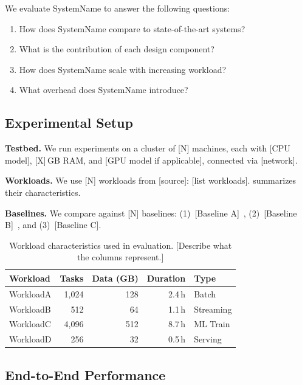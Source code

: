 \documentclass[letterpaper,twocolumn,10pt]{article}
\newcommand{\system}{SystemName\xspace}
\newcommand{\para}[1]{\smallskip\noindent\textbf{#1.}}
\newcommand{\GB}{\,GB\xspace}
\begin{document}
We evaluate \system to answer the following questions:
\begin{enumerate}
  \item How does \system compare to state-of-the-art systems?
  \item What is the contribution of each design component?
  \item How does \system scale with increasing workload?
  \item What overhead does \system introduce?
\end{enumerate}

\subsection{Experimental Setup}
\label{sec:eval:setup}

\para{Testbed}
We run experiments on a cluster of [N] machines, each with
[CPU model], [X]\GB RAM, and [GPU model if applicable],
connected via [network].

\para{Workloads}
We use [N] workloads from [source]: [list workloads].
 summarizes their characteristics.

\para{Baselines}
We compare against [N] baselines:
(1)~[Baseline A]~\cite{verma2015borg},
(2)~[Baseline B]~\cite{ongaro2014raft}, and
(3)~[Baseline C].

\begin{table}[t]
  \caption{Workload characteristics used in evaluation.
    [Describe what the columns represent.]}
  \label{tab:workloads}
  \centering
  \begin{small}
  \begin{tabular}{@{}lrrrl@{}}
    \toprule
    \textbf{Workload} & \textbf{Tasks} & \textbf{Data (GB)} &
    \textbf{Duration} & \textbf{Type} \\
    \midrule
    WorkloadA  & 1,024  & 128  & 2.4\,h  & Batch     \\
    WorkloadB  & 512    & 64   & 1.1\,h  & Streaming \\
    WorkloadC  & 4,096  & 512  & 8.7\,h  & ML Train  \\
    WorkloadD  & 256    & 32   & 0.5\,h  & Serving   \\
    \bottomrule
  \end{tabular}
  \end{small}
\end{table}

\subsection{End-to-End Performance}
\label{sec:eval:e2e}
\end{document}
